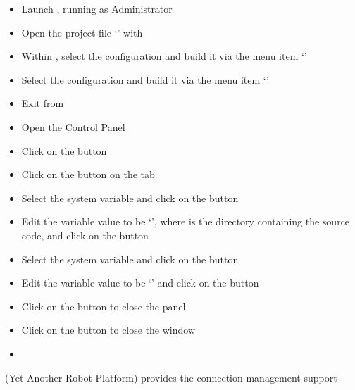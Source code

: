 \begin{itemize}
\item Launch , running as Administrator
\item\exSp{} Open the project file
`' with
\item\exSp{} Within , select the  configuration and
build it via the menu item `'
\item\exSp{} Select the  configuration and build it via the menu item
`'
\item\exSp{} Exit from 
\item\exSp{} Open the  Control Panel
\item\exSp{} Click on the  button
\item\exSp{} Click on the  button on the 
tab
\item\exSp{} Select the  system variable and click on the
 button 
\item\exSp{} Edit the variable value to be
`', where 
is the directory containing the \mplusm{} source code, and click on the  button
\item\exSp{} Select the  system variable and click on
the  button 
\item\exSp{} Edit the variable value to be
`' and click on the
 button
\item\exSp{} Click on the  button to close the 
panel
\item\exSp{} Click on the  button to close the 
window
\end{itemize}
\tertiaryEnd
{}
\begin{itemize}
\item\TBD
\end{itemize}
\tertiaryEnd
\secondaryEnd
\textbf{\yarp} (Yet Another Robot Platform) provides the connection management support
